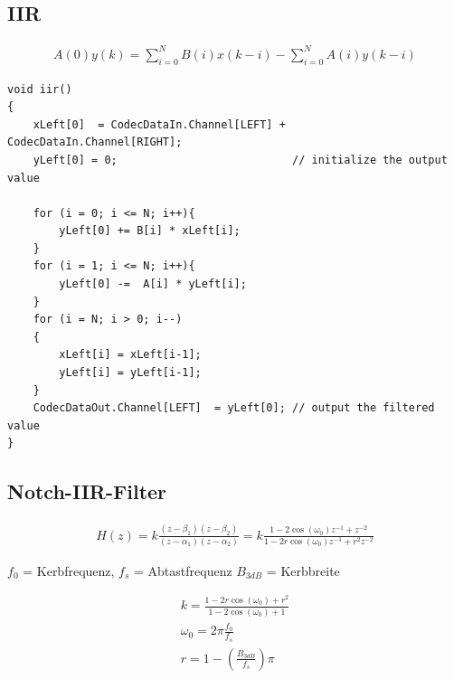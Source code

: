 \documentclass[10pt,a4paper]{article}
\begin{document}
\subsection{IIR}
  \begin{mdframed}[style=exercise]
    \begin{align}
        A(0)y(k)=\sum_{i=0}^{N} B(i) x(k-i) - \sum_{i=0}^{N} A(i) y(k-i)
    \end{align}
  \end{mdframed}
\begin{verbatim}
void iir()
{
    xLeft[0]  = CodecDataIn.Channel[LEFT] + CodecDataIn.Channel[RIGHT];
    yLeft[0] = 0;                           // initialize the output value

    for (i = 0; i <= N; i++){
        yLeft[0] += B[i] * xLeft[i];
    }
    for (i = 1; i <= N; i++){
        yLeft[0] -=  A[i] * yLeft[i];
    }
    for (i = N; i > 0; i--)
    {
        xLeft[i] = xLeft[i-1];
        yLeft[i] = yLeft[i-1];
    }
    CodecDataOut.Channel[LEFT]  = yLeft[0]; // output the filtered value
}
\end{verbatim}

\subsection{Notch-IIR-Filter}
  \begin{mdframed}[style=exercise]
    \begin{align}
  H(z) = k \frac{(z-\beta_1)(z-\beta_2)}{(z-\alpha_1)(z-\alpha_2)} 
       = k \frac{1-2\cos(\omega_0)z^{-1}+z^{-2}}{1-2r\cos(\omega_0)z^{-1}+r^2 z^{-2}}
    \end{align}
  \end{mdframed}
$f_0$ = Kerbfrequenz, $f_s$ = Abtastfrequenz $B_{3dB}$ = Kerbbreite 
  \begin{mdframed}[style=exercise]
    \begin{align}
      k = \frac{1-2r\cos(\omega_0)+r^2}{1-2\cos(\omega_0)+1}\\
      \omega_0 = 2\pi \frac{f_0}{f_s}\\
      r=1-(\frac{B_{3dB}}{f_s})\pi
    \end{align}
  \end{mdframed}
\end{document}
